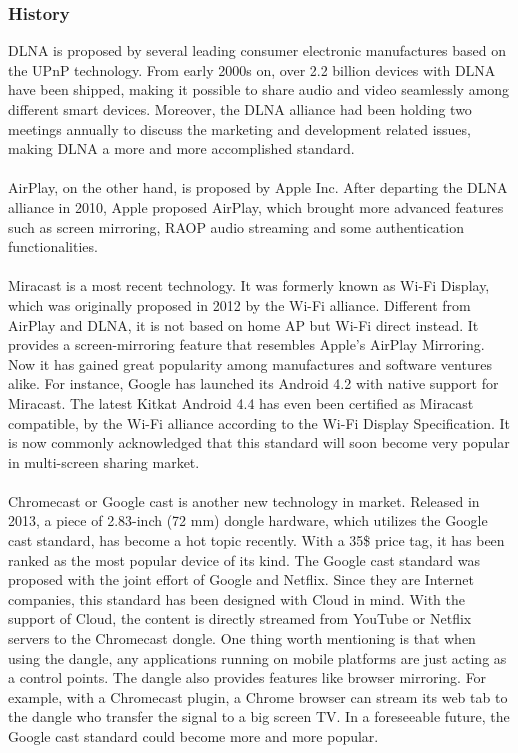 \subsubsection{History\label{2_3_1}} 
DLNA is proposed by several leading consumer electronic manufactures based on the UPnP 
technology. From early 2000s on, over 2.2 billion devices with DLNA have been shipped, 
making it possible to share audio and video seamlessly among different smart devices. Moreover, the DLNA alliance had been holding two meetings annually to discuss the marketing and development related issues, making DLNA a more and more accomplished standard. \\
\\
AirPlay, on the other hand, is proposed by Apple Inc. After departing the DLNA alliance in 2010, Apple proposed AirPlay, which brought more advanced features such as screen mirroring, RAOP audio streaming and some authentication functionalities. \\
\\
Miracast is a most recent technology. It was formerly known as Wi-Fi Display, which was originally proposed in 2012 by the Wi-Fi alliance. Different from AirPlay and DLNA, it is not based on home AP but Wi-Fi direct instead. It provides a screen-mirroring feature that resembles Apple's AirPlay Mirroring. Now it has gained great popularity among manufactures and software ventures alike. For instance, Google has launched its Android 4.2 with native support for Miracast. The latest Kitkat Android 4.4 has even been certified as Miracast compatible, by the Wi-Fi alliance according to the Wi-Fi Display Specification. It is now commonly acknowledged that this standard will soon become very popular in multi-screen sharing market. \\
\\
Chromecast or Google cast is another new technology in 
market. Released in 2013, a piece of 2.83-inch (72 mm) dongle hardware, which utilizes the Google cast standard, has become a hot topic recently. With a 35\$ price tag, it has been ranked as the most 
popular device of its kind. The Google cast standard was proposed with the joint effort of 
Google and Netflix. Since they are Internet companies, this standard has been 
designed with Cloud in mind. With the support of Cloud, the content is directly streamed from YouTube or Netflix servers to the Chromecast dongle. One thing worth mentioning is that when using the dangle, any applications running on mobile platforms are just acting as a control points. The dangle also provides features like browser mirroring. For example, with a Chromecast plugin, a Chrome browser can stream its web tab to the dangle who transfer the signal to a big screen TV. In a foreseeable future, the Google cast standard could become more and more popular. 
